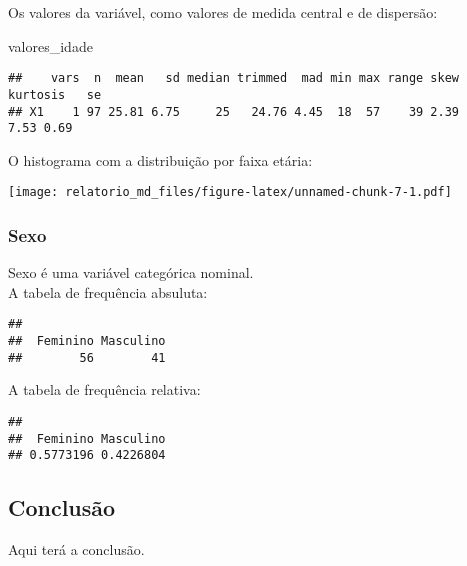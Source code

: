 \documentclass[
]{article}
\newenvironment{Shaded}{\begin{snugshade}}{\end{snugshade}}
\newcommand{\KeywordTok}[1]{\textcolor[rgb]{0.13,0.29,0.53}{\textbf{#1}}}
\newcommand{\NormalTok}[1]{#1}
\newcommand{\OperatorTok}[1]{\textcolor[rgb]{0.81,0.36,0.00}{\textbf{#1}}}
\begin{document}
Os valores da variável, como valores de medida central e de dispersão:

\begin{Shaded}
\begin{Highlighting}[]
\NormalTok{valores_idade}
\end{Highlighting}
\end{Shaded}

\begin{verbatim}
##    vars  n  mean   sd median trimmed  mad min max range skew kurtosis   se
## X1    1 97 25.81 6.75     25   24.76 4.45  18  57    39 2.39     7.53 0.69
\end{verbatim}

O histograma com a distribuição por faixa etária:

\begin{Shaded}
\end{Shaded}

\texttt{[image: relatorio\_md\_files/figure-latex/unnamed-chunk-7-1.pdf]}

\hypertarget{sexo}{%
\subsubsection{Sexo}\label{sexo}}

Sexo é uma variável categórica nominal.\\
A tabela de frequência absuluta:

\begin{Shaded}
\end{Shaded}

\begin{verbatim}
## 
##  Feminino Masculino 
##        56        41
\end{verbatim}

A tabela de frequência relativa:

\begin{Shaded}
\end{Shaded}

\begin{verbatim}
## 
##  Feminino Masculino 
## 0.5773196 0.4226804
\end{verbatim}

\hypertarget{conclusuxe3o}{%
\subsection{Conclusão}\label{conclusuxe3o}}

Aqui terá a conclusão.
\end{document}
